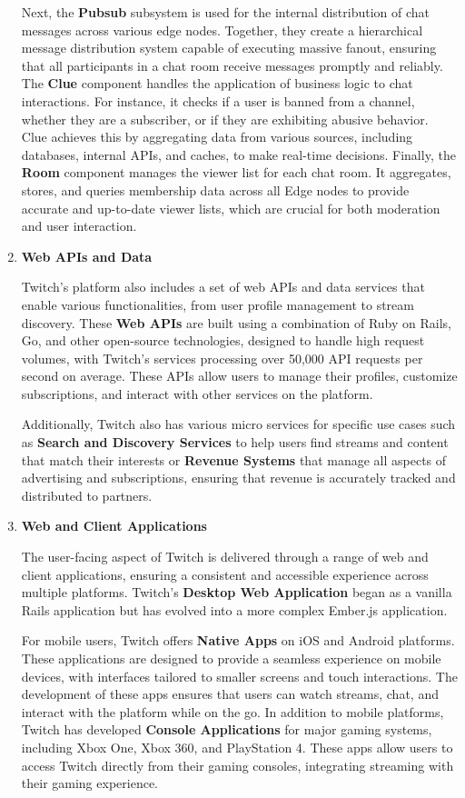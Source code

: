\begin{enumerate}
    Next, the \textbf{Pubsub} subsystem is used for the internal distribution of chat messages across various edge nodes. Together, they create a hierarchical message distribution system capable of executing massive fanout, ensuring that all participants in a chat room receive messages promptly and reliably. The \textbf{Clue} component handles the application of business logic to chat interactions. For instance, it checks if a user is banned from a channel, whether they are a subscriber, or if they are exhibiting abusive behavior. Clue achieves this by aggregating data from various sources, including databases, internal \ac{API}s, and caches, to make real-time decisions. Finally, the \textbf{Room} component manages the viewer list for each chat room. It aggregates, stores, and queries membership data across all Edge nodes to provide accurate and up-to-date viewer lists, which are crucial for both moderation and user interaction.

    \item \textbf{Web \ac{API}s and Data}

    Twitch’s platform also includes a set of web \ac{API}s and data services that enable various functionalities, from user profile management to stream discovery. These \textbf{Web \ac{API}s} are built using a combination of Ruby on Rails, Go, and other open-source technologies, designed to handle high request volumes, with Twitch's services processing over 50,000 \ac{API} requests per second on average. These \ac{API}s allow users to manage their profiles, customize subscriptions, and interact with other services on the platform.

    Additionally, Twitch also has various micro services for specific use cases such as \textbf{Search and Discovery Services} to help users find streams and content that match their interests or \textbf{Revenue Systems} that manage all aspects of advertising and subscriptions, ensuring that revenue is accurately tracked and distributed to partners. 
    
    \item \textbf{Web and Client Applications}

    The user-facing aspect of Twitch is delivered through a range of web and client applications, ensuring a consistent and  accessible experience across multiple platforms. Twitch’s \textbf{Desktop Web Application} began as a vanilla Rails application but has evolved into a more complex Ember.js application.

    For mobile users, Twitch offers \textbf{Native Apps} on iOS and Android platforms. These applications are designed to provide a seamless experience on mobile devices, with interfaces tailored to smaller screens and touch interactions. The development of these apps ensures that users can watch streams, chat, and interact with the platform while on the go. In addition to mobile platforms, Twitch has developed \textbf{Console Applications} for major gaming systems, including Xbox One, Xbox 360, and PlayStation 4. These apps allow users to access Twitch directly from their gaming consoles, integrating streaming with their gaming experience.


\end{enumerate}
